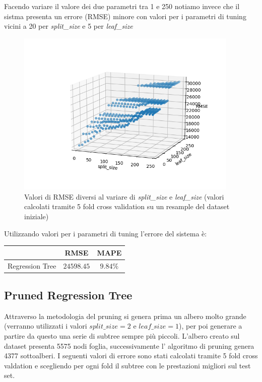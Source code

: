 \documentclass{article}
\begin{document}
    Facendo variare il valore dei due parametri tra 1 e 250 notiamo invece 
    che il sistma presenta un errore (RMSE) minore con valori per i parametri di tuning
    vicini a 20 per \textit{split\_size} e 5 per \textit{leaf\_size}
    \begin{figure}[h]
        \caption{Valori di RMSE diversi al variare di \textit{split\_size}
        e \textit{leaf\_size} (valori calcolati tramite 5 fold cross
        validation su un resample del dataset iniziale)}
        \includegraphics[width=10.6cm]{tree}
        \centering
    \end{figure}

    Utilizzando valori per i parametri di tuning l'errore del sistema è:
    \begin{center}
        \begin{tabular}{|c|c|c|}
            \hline
             & \textbf{RMSE} & \textbf{MAPE} \\
            \hline
            Regression Tree & $24598.45$ &  $9.84\%$ \\
            \hline
        \end{tabular}
    \end{center}


    \subsection{Pruned Regression Tree}
    Attraverso la metodologia del pruning si genera prima un albero molto grande
    (verranno utilizzati i valori $\textit{split\_size}=2$ e $\textit{leaf\_size}=1$),
    per poi generare a partire da questo una serie di subtree sempre più piccoli.
    L'albero creato sul dataset presenta 5575 nodi foglia, successivamente l'
    algoritmo di pruning genera 4377 sottoalberi. I seguenti valori di errore sono stati
    calcolati tramite 5 fold cross valdation e scegliendo per ogni fold il subtree con le 
    prestazioni migliori sul test set.
\end{document}
